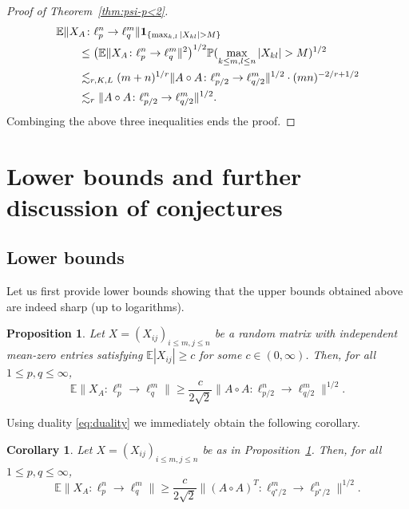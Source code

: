 \documentclass[a4paper]{amsart}
\newtheorem{corollary}[theorem]{Corollary} %
\newtheorem{proposition}[theorem]{Proposition} %
\theoremstyle{definition}
\theoremstyle{remark}
\numberwithin{equation}{section}
\newcommand*{\EE}{\mathbb{E}}
\newcommand*{\PP}{\mathbb{P}}
\newcommand*{\hadprod}{\mathbin{\circ}} %
\newcommand*{\ind}{\mathbf{1}} %
\begin{document}
\begin{proof}[Proof of Theorem~\ref{thm:psi-p<2}]
		\begin{align*}
		\MoveEqLeft
		\EE \|X_A \colon \ell^n_p\to \ell^m_q\| \ind_{\{ \max_{k,l} |X_{kl}|> M\}}\\
		&\leq \bigl(	\EE \|X_A \colon \ell^n_p\to \ell^m_q\|^2\bigr)^{1/2}
		\PP( \max_{k\leq m, l\leq n} |X_{kl}| > M)^{1/2}\\
		& \lesssim_{r, K, L}  (m+n)^{1/r}	\|A\hadprod A \colon \ell^n_{p/2} \to \ell^m_{q/2} \|^{1/2}  \cdot (mn)^{-2/r +1/2}\\
        & \lesssim_{r} 	\|A\hadprod A \colon \ell^n_{p/2} \to \ell^m_{q/2} \|^{1/2}.
		\end{align*}
		Combinging the above three inequalities ends the proof.
\end{proof}





%
\section{Lower bounds and further discussion of conjectures}
\label{sec:lower-bounds}
%

\subsection{Lower bounds}
\label{subsec:lower-bounds}
Let us first provide lower bounds showing that the upper bounds obtained above
are indeed  sharp (up to logarithms).

\begin{proposition}
	\label{prop:cm-lower-bound}
	Let $X = (X_{ij})_{i\leq m, j\leq n}$ be a random matrix with independent  mean-zero entries satisfying $\EE |X_{ij}| \ge c$ for some $c\in(0,\infty)$.
	Then, for all $1\leq p, q\leq \infty$,
	\[
	\EE \|X_A\colon \ell_{p}^n\to\ell_q^m\|
	\geq \frac{c}{2\sqrt 2}\|A\hadprod A \colon \ell^n_{p/2} \to \ell^m_{q/2} \|^{1/2}.
	\]
\end{proposition}
Using duality \eqref{eq:duality}	  we immediately obtain the following corollary.

\begin{corollary}\label{cor:cm-lower-bound}
	Let $X = (X_{ij})_{i\leq m, j\leq n}$ be as in Proposition~\ref{prop:cm-lower-bound}. Then, for all $1\leq p,q\leq \infty$,
	\[
	\EE \|X_A\colon \ell_{p}^n\to\ell_q^m\|
	\geq \frac{c}{2\sqrt 2}\|(A\hadprod A)^T \colon \ell^m_{q^*/2} \to \ell^n_{p^*/2}\|^{1/2}.
	\]
\end{corollary}
\end{document}
